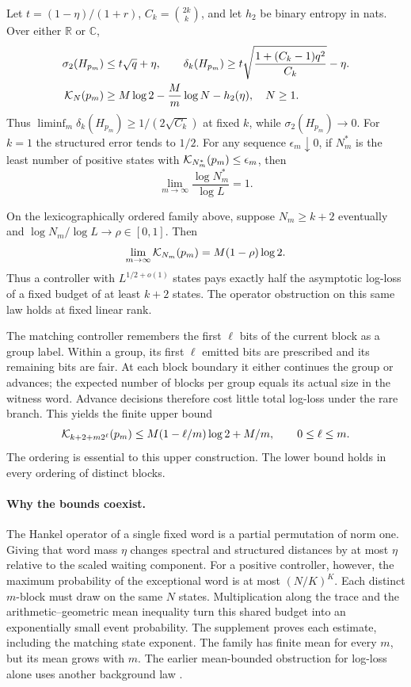 \begin{theorem}\label{th:joint}
Let \(t=(1-\eta)/(1+r)\), \(C_k=\binom{2k}{k}\), and let \(h_2\) be binary entropy in nats. Over either \(\mathbb R\) or \(\mathbb C\),
\begin{align}
 \sigma_2(H_{p_m})&\le t\sqrt q+\eta,\qquad
 \delta_k(H_{p_m})\ge t\sqrt{\frac{1+(C_k-1)q^2}{C_k}}-\eta .
 \label{eq:spec}\\
 \mathcal K_N(p_m)&\ge M\log 2-\frac{M}{m}\log N-h_2(\eta),\quad N\ge1.
 \label{eq:kl}
\end{align}
Thus \(\liminf_m\delta_k(H_{p_m})\ge1/(2\sqrt{C_k})\) at fixed \(k\), while \(\sigma_2(H_{p_m})\to0\). For \(k=1\) the structured error tends to \(1/2\). For any sequence \(\epsilon_m\downarrow0\), if \(N_m^*\) is the least number of positive states with \(\mathcal K_{N_m^*}(p_m)\le\epsilon_m\), then
\[
                    \lim_{m\to\infty}\frac{\log N_m^*}{\log L}=1 .
\]
\end{theorem}

\begin{theorem}\label{th:frontier}
On the lexicographically ordered family above, suppose $N_m\ge k+2$ eventually and $\log N_m/\log L\to\rho\in[0,1]$. Then
\[
                \lim_{m\to\infty}\mathcal K_{N_m}(p_m)=M(1-\rho)\log 2 .
\]
Thus a controller with $L^{1/2+o(1)}$ states pays exactly half the asymptotic log-loss of a fixed budget of at least $k+2$ states. The operator obstruction on this same law holds at fixed linear rank.
\end{theorem}

The matching controller remembers the first $\ell$ bits of the current block as a group label. Within a group, its first $\ell$ emitted bits are prescribed and its remaining bits are fair. At each block boundary it either continues the group or advances; the expected number of blocks per group equals its actual size in the witness word. Advance decisions therefore cost little total log-loss under the rare branch. This yields the finite upper bound
\[
 \mathcal K_{k+2+m2^\ell}(p_m)\le M(1-\ell/m)\log2+M/m,
 \qquad 0\le\ell\le m .
\]
The ordering is essential to this upper construction. The lower bound holds in every ordering of distinct blocks.
\paragraph{Why the bounds coexist.}
The Hankel operator of a single fixed word is a partial permutation of norm one. Giving that word mass \(\eta\) changes spectral and structured distances by at most \(\eta\) relative to the scaled waiting component. For a positive controller, however, the maximum probability of the exceptional word is at most \((N/K)^K\). Each distinct \(m\)-block must draw on the same \(N\) states. Multiplication along the trace and the arithmetic--geometric mean inequality turn this shared budget into an exponentially small event probability. The supplement proves each estimate, including the matching state exponent. The family has finite mean for every \(m\), but its mean grows with \(m\). The earlier mean-bounded obstruction for log-loss alone uses another background law \cite{draga}.


